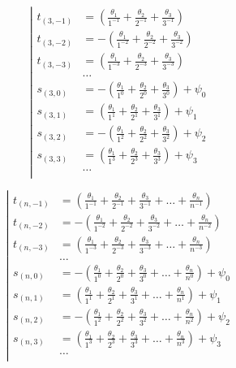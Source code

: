 \begin{equation*} \left| \begin{aligned}
t_{(3,-1)} &=
  \left(
  \frac{\theta_1}{1^{-1}}
+ \frac{\theta_2}{2^{-1}}
+ \frac{\theta_3}{3^{-1}} \right) \\
%
t_{(3,-2)} &=
- \left(
  \frac{\theta_1}{1^{-2}}
+ \frac{\theta_2}{2^{-2}}
+ \frac{\theta_3}{3^{-2}} \right) \\
%
t_{(3,-3)} &=
  \left(
  \frac{\theta_1}{1^{-3}}
+ \frac{\theta_2}{2^{-3}}
+ \frac{\theta_3}{3^{-3}} \right) \\
%
&\ldots \\
%
s_{(3,0)} &=
- \left(
  \frac{\theta_1}{1^0}
+ \frac{\theta_2}{2^0}
+ \frac{\theta_3}{3^0} \right)
+ \psi_0 \\
%
s_{(3,1)} &=
  \left(
  \frac{\theta_1}{1^1}
+ \frac{\theta_2}{2^1}
+ \frac{\theta_3}{3^1} \right)
+ \psi_1 \\
%
s_{(3,2)} &=
- \left(
  \frac{\theta_1}{1^2}
+ \frac{\theta_2}{2^2}
+ \frac{\theta_3}{3^2} \right)
+ \psi_2 \\
%
s_{(3,3)} &=
  \left(
  \frac{\theta_1}{1^3}
+ \frac{\theta_2}{2^3}
+ \frac{\theta_3}{3^3} \right)
+ \psi_3 \\
%
&\ldots \\
\end{aligned} \right. \end{equation*}

\begin{equation*} \left| \begin{aligned}
t_{(n,-1)} &=
  \left(
  \frac{\theta_1}{1^{-1}}
+ \frac{\theta_2}{2^{-1}}
+ \frac{\theta_3}{3^{-1}}
+ \ldots
+ \frac{\theta_n}{n^{-1}} \right) \\
%
t_{(n,-2)} &=
- \left(
  \frac{\theta_1}{1^{-2}}
+ \frac{\theta_2}{2^{-2}}
+ \frac{\theta_3}{3^{-2}}
+ \ldots
+ \frac{\theta_n}{n^{-2}} \right) \\
%
t_{(n,-3)} &=
  \left(
  \frac{\theta_1}{1^{-3}}
+ \frac{\theta_2}{2^{-3}}
+ \frac{\theta_3}{3^{-3}}
+ \ldots
+ \frac{\theta_n}{n^{-3}} \right) \\
%
&\ldots \\
%
s_{(n,0)} &=
- \left(
  \frac{\theta_1}{1^0}
+ \frac{\theta_2}{2^0}
+ \frac{\theta_3}{3^0}
+ \ldots
+ \frac{\theta_n}{n^0} \right)
+ \psi_0 \\
%
s_{(n,1)} &=
  \left(
  \frac{\theta_1}{1^1}
+ \frac{\theta_2}{2^1}
+ \frac{\theta_3}{3^1}
+ \ldots
+ \frac{\theta_n}{n^1} \right)
+ \psi_1 \\
%
s_{(n,2)} &=
- \left(
  \frac{\theta_1}{1^2}
+ \frac{\theta_2}{2^2}
+ \frac{\theta_3}{3^2}
+ \ldots
+ \frac{\theta_n}{n^2} \right)
+ \psi_2 \\
%
s_{(n,3)} &=
  \left(
  \frac{\theta_1}{1^3}
+ \frac{\theta_2}{2^3}
+ \frac{\theta_3}{3^3}
+ \ldots
+ \frac{\theta_n}{n^3} \right)
+ \psi_3 \\
%
&\ldots \\
\end{aligned} \right. \end{equation*}